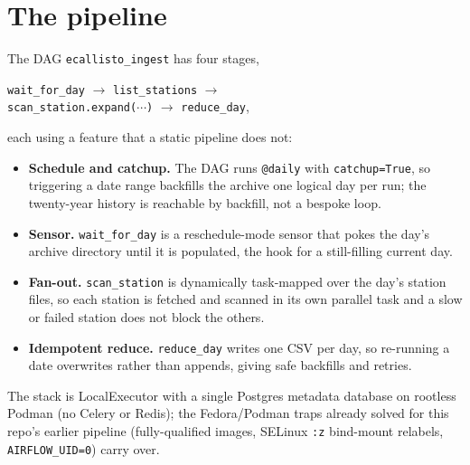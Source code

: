 \documentclass[twocolumn]{aastex631}
\newcommand{\code}[1]{\texttt{#1}}
\begin{document}
\section{The pipeline}
The DAG \code{ecallisto\_ingest} has four stages,
\begin{center}
\code{wait\_for\_day} $\rightarrow$ \code{list\_stations} $\rightarrow$ \\
\code{scan\_station.expand($\cdots$)} $\rightarrow$ \code{reduce\_day},
\end{center}
each using a feature that a static pipeline does not:
\begin{itemize}
\item \textbf{Schedule and catchup.} The DAG runs \code{@daily} with \code{catchup=True}, so triggering a
date range backfills the archive one logical day per run; the twenty-year history is reachable by
backfill, not a bespoke loop.
\item \textbf{Sensor.} \code{wait\_for\_day} is a reschedule-mode sensor that pokes the day's archive
directory until it is populated, the hook for a still-filling current day.
\item \textbf{Fan-out.} \code{scan\_station} is dynamically task-mapped over the day's station
files, so each station is fetched and scanned in its own parallel task and a slow or failed station does
not block the others.
\item \textbf{Idempotent reduce.} \code{reduce\_day} writes one CSV per day, so re-running a date
overwrites rather than appends, giving safe backfills and retries.
\end{itemize}
The stack is LocalExecutor with a single Postgres metadata database on rootless Podman (no Celery or
Redis); the Fedora/Podman traps already solved for this repo's earlier pipeline (fully-qualified images,
SELinux \code{:z} bind-mount relabels, \code{AIRFLOW\_UID=0}) carry over.
\end{document}
